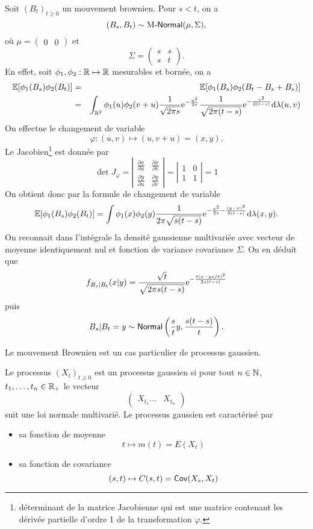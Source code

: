 \begin{ex}\label{ex:conditional_distribution_Bt}
Soit $(B_t)_{t\geq 0}$ un mouvement brownien. Pour $s < t$, on a 
$$
(B_s,B_t)\sim\text{M-}\mathsf{Normal}(\mu, \Sigma),
$$
où 
$\mu = (\begin{array}{cc}0&0\end{array})$ et 
$$
\Sigma = \left(\begin{array}{cc}s&s\\
s&t
\end{array}\right).
$$
En effet, soit $\phi_1, \phi_2:\mathbb{R}\mapsto \mathbb{R}$ mesurables et bornée, on a 
\begin{eqnarray*}
\mathbb{E}[\phi_1(B_s)\phi_2(B_t)] &=& \mathbb{E}[\phi_1(B_s)\phi_2(B_t - B_s + B_s)]\\
&=& \int_{\mathbb{R}^2}\phi_1(u)\phi_2(v+u)\frac{1}{\sqrt{2\pi s}}\mathrm{e}^{-\frac{u^2}{2s}}\frac{1}{\sqrt{2\pi (t-s)}}\mathrm{e}^{-\frac{v^2}{2(t-s)}}\text{d}\lambda(u,v)\\
\end{eqnarray*}
On effectue le changement de variable 
$$
\varphi:(u,v)\mapsto(u, v+u) = (x,y).
$$
Le Jacobien\footnote{déterminant de la matrice Jacobienne qui est une matrice contenant les dérivée partielle d'ordre 1 de la transformation $\varphi$.} est donnée par 
$$
\det J_\varphi= \left|\begin{array}{cc}\frac{\partial x}{\partial u}&\frac{\partial x}{\partial v}\\
\frac{\partial y}{\partial u}&\frac{\partial y}{\partial v}
\end{array}\right| = \left|\begin{array}{cc}1&0\\
1&1
\end{array}\right|
=1$$
On obtient donc par la formule de changement de variable
$$
\mathbb{E}[\phi_1(B_s)\phi_2(B_t)] = \int\phi_1(x)\phi_2(y)\frac{1}{2\pi \sqrt{s(t-s)}}\mathrm{e}^{-\frac{x^2}{2s}-\frac{(y-x)^2}{2(t-s)}}\text{d}\lambda(x,y).\\
$$
On reconnait dans l'intégrale la densité gaussienne multivariée avec vecteur de moyenne identiquement nul et fonction de variance covariance $\Sigma$. On en déduit que 
$$
f_{B_s|B_t}(x|y) = \frac{\sqrt{t}}{\sqrt{2\pi s(t-s)}}\mathrm{e}^{-\frac{t(x-ys/t)^2}{2s(t-s)}}
$$
puis 
$$
B_s|B_t=y\sim\mathsf{Normal}\left(\frac{s}{t}y, \frac{s(t-s)}{t}\right).
$$

\end{ex}
Le mouvement Brownien est un cas particulier de processus gaussien. 
\begin{definition}
Le processus $(X_t)_{t\geq 0}$ est un processus gaussien si pour tout $n\in\mathbb{N}$, $t_1,\ldots, t_n\in \mathbb{R}_+$ le vecteur
$$
(\begin{array}{ccc}X_{t_1}\ldots &X_{t_n}\end{array})
$$
suit une loi normale multivarié. Le processus gaussien est caractérisé par 
\begin{itemize}
\item sa fonction de moyenne
$$
t\mapsto m(t)=E(X_t)
$$
\item sa fonction de covariance 
$$
(s,t)\mapsto C(s,t)=\mathsf{Cov}(X_s,X_t)
$$
\end{itemize}
\end{definition}

